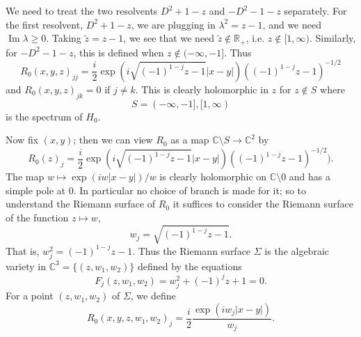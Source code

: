 \documentclass[12pt]{report}
\newcommand{\RR}{\mathbb{R}}
\newcommand{\CC}{\mathbb{C}}
\renewcommand{\Im}{\operatorname{Im}}
\theoremstyle{definition}
\begin{document}
We need to treat the two resolvents $D^2 + 1 - z$ and $-D^2 - 1 - z$ separately.
For the first resolvent, $D^2 + 1 - z$, we are plugging in $\lambda^2 = z - 1$, and we need $\Im \lambda \geq 0$.
Taking $\widetilde z = z - 1$, we see that we need $\widetilde z \notin \RR_+$, i.e. $z \notin [1, \infty)$.
Similarly, for $-D^2 - 1 - z$, this is defined when $z \notin (-\infty, -1]$. Thus
$$R_0(x, y, z)_{jj} = \frac{i}{2} \exp(i\sqrt{(-1)^{1-j}z -1}|x-y|)((-1)^{1-j}z -1)^{-1/2}$$
and $R_0(x,y,z)_{jk} = 0$ if $j \neq k$.
This is clearly holomorphic in $z$ for $z \notin S$ where
$$S = (-\infty, -1], [1, \infty)$$
is the spectrum of $H_0$.

Now fix $(x, y)$; then we can view $R_0$ as a map $\CC \setminus S \to \CC^2$ by
$$R_0(z)_j = \frac{i}{2} \exp(i\sqrt{(-1)^{1-j}z -1}|x-y|)((-1)^{1-j}z -1)^{-1/2}).$$
The map $w \mapsto \exp(iw|x-y|)/w$ is clearly holomorphic on $\CC \setminus 0$ and has a simple pole at $0$.
In particular no choice of branch is made for it; so to understand the Riemann surface of $R_0$ it suffices to consider the Riemann surface of the function $z \mapsto w$,
$$w_j = \sqrt{(-1)^{1-j}z-1}.$$
That is, $w_j^2 = (-1)^{1-j}z - 1$. Thus the Riemann surface $\Sigma$ is the algebraic variety in $\CC^3 = \{(z, w_1, w_2)\}$ defined by the equations
$$F_j(z, w_1, w_2) = w_j^2 + (-1)^jz + 1 = 0.$$
For a point $(z, w_1, w_2)$ of $\Sigma$, we define
$$R_0(x, y, z, w_1, w_2)_j = \frac{i}{2} \frac{\exp(iw_j|x-y|)}{w_j}.$$
\end{document}
